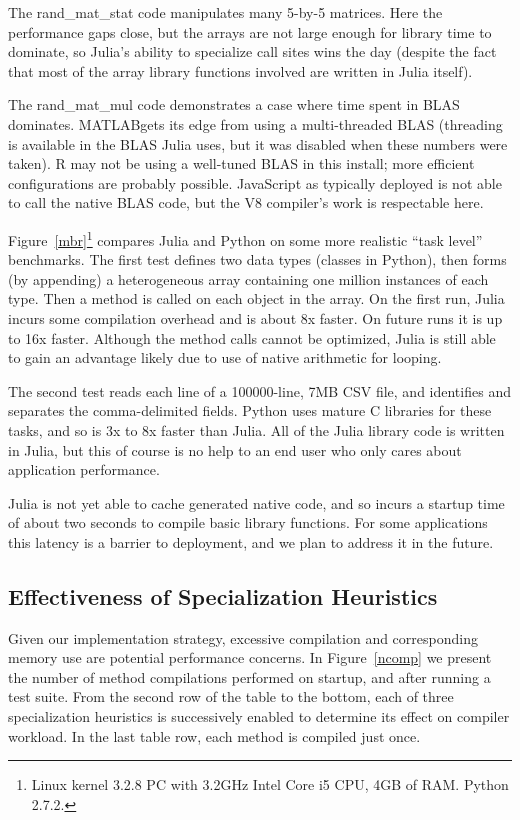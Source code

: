 \documentclass[9pt]{sigplanconf}
\begin{document}
The rand\_mat\_stat code manipulates many 5-by-5 matrices. Here the
performance gaps close, but the arrays are not large enough for
library time to dominate, so Julia's ability to specialize call sites
wins the day (despite the fact that most of the array library functions
involved are written in Julia itself).

The rand\_mat\_mul code demonstrates a case where time spent in BLAS \cite{blas}
dominates. MATLAB\textregistered gets its edge from using a
multi-threaded BLAS (threading is available in the BLAS Julia uses,
but it was disabled when these numbers were taken). R may not be using
a well-tuned BLAS in this install; more efficient configurations are
probably possible.
JavaScript as typically deployed is not able to call the native BLAS code,
but the V8 compiler's work is respectable here.

Figure~\ref{mbr}\footnote{
Linux kernel 3.2.8 PC with 3.2GHz Intel Core i5 CPU, 4GB of RAM.
Python 2.7.2.} compares Julia and Python on some
more realistic ``task level'' benchmarks. The first test defines two
data types (classes in Python), then forms (by appending) a heterogeneous
array containing one million instances of each type. Then a method is called
on each object in the array. On the first run, Julia incurs some compilation
overhead and is about 8x faster. On future runs it is up to 16x faster.
Although the method calls cannot be optimized, Julia is still able to
gain an advantage likely due to use of native arithmetic for looping.

The second test reads each line of a 100000-line, 7MB CSV file, and
identifies and separates the comma-delimited fields. Python uses mature
C libraries for these tasks, and so is 3x to 8x faster than Julia. All of
the Julia library code is written in Julia, but this of course is no help
to an end user who only cares about application performance.

Julia is not yet able to cache generated native code, and so incurs a
startup time of about two seconds to compile basic library functions.
For some applications this latency is a barrier to deployment, and we plan
to address it in the future.


\subsection{Effectiveness of Specialization Heuristics}

Given our implementation strategy, excessive compilation and corresponding
memory use are potential performance concerns. In Figure~\ref{ncomp}
we present the number of method compilations performed on startup, and
after running a test suite. From the second row of the table to the bottom,
each of three specialization heuristics is successively enabled to
determine its effect on compiler workload. In the last table row, each
method is compiled just once.
\end{document}
